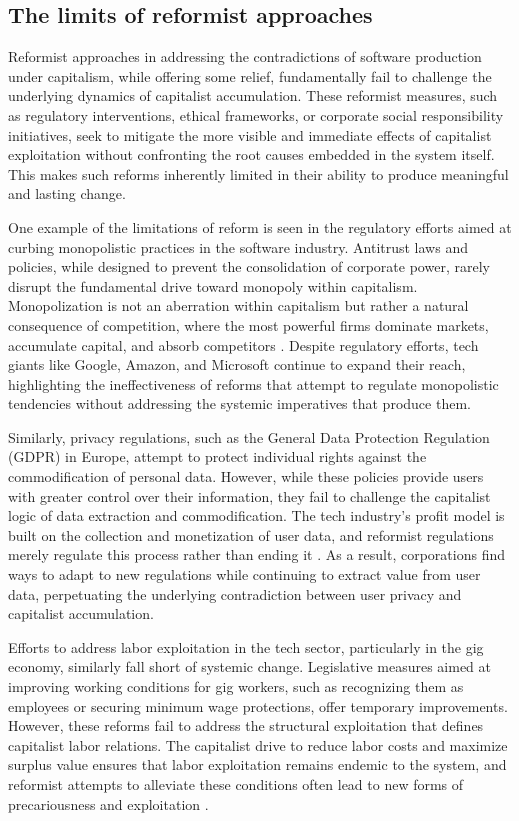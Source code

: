 \begin{refsection}
\subsection{The limits of reformist approaches}

Reformist approaches in addressing the contradictions of software production under capitalism, while offering some relief, fundamentally fail to challenge the underlying dynamics of capitalist accumulation. These reformist measures, such as regulatory interventions, ethical frameworks, or corporate social responsibility initiatives, seek to mitigate the more visible and immediate effects of capitalist exploitation without confronting the root causes embedded in the system itself. This makes such reforms inherently limited in their ability to produce meaningful and lasting change.

One example of the limitations of reform is seen in the regulatory efforts aimed at curbing monopolistic practices in the software industry. Antitrust laws and policies, while designed to prevent the consolidation of corporate power, rarely disrupt the fundamental drive toward monopoly within capitalism. Monopolization is not an aberration within capitalism but rather a natural consequence of competition, where the most powerful firms dominate markets, accumulate capital, and absorb competitors \cite[pp.~45-47]{fuchs2015}. Despite regulatory efforts, tech giants like Google, Amazon, and Microsoft continue to expand their reach, highlighting the ineffectiveness of reforms that attempt to regulate monopolistic tendencies without addressing the systemic imperatives that produce them.

Similarly, privacy regulations, such as the General Data Protection Regulation (GDPR) in Europe, attempt to protect individual rights against the commodification of personal data. However, while these policies provide users with greater control over their information, they fail to challenge the capitalist logic of data extraction and commodification. The tech industry’s profit model is built on the collection and monetization of user data, and reformist regulations merely regulate this process rather than ending it \cite[pp.~111-113]{zuboff2020}. As a result, corporations find ways to adapt to new regulations while continuing to extract value from user data, perpetuating the underlying contradiction between user privacy and capitalist accumulation.

Efforts to address labor exploitation in the tech sector, particularly in the gig economy, similarly fall short of systemic change. Legislative measures aimed at improving working conditions for gig workers, such as recognizing them as employees or securing minimum wage protections, offer temporary improvements. However, these reforms fail to address the structural exploitation that defines capitalist labor relations. The capitalist drive to reduce labor costs and maximize surplus value ensures that labor exploitation remains endemic to the system, and reformist attempts to alleviate these conditions often lead to new forms of precariousness and exploitation \cite[pp.~145-148]{scholz2017}.


\end{refsection}
